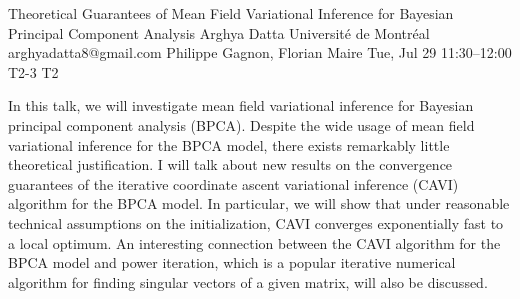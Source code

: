 \documentclass[12pt,lettersize,oneside]{book} %
\begin{document}
\begin{talk}
  {Theoretical Guarantees of Mean Field Variational Inference for Bayesian Principal Component Analysis}%
  {Arghya Datta}%
  {Universit\'e de Montr\'eal}%
  {arghyadatta8@gmail.com}%
  {Philippe Gagnon, Florian Maire}%
  {}%
  {Tue, Jul 29 11:30--12:00}%
  {T2-3}%
  {T2}%
  
    
   
In this talk, we will investigate mean field variational inference for Bayesian principal component analysis (BPCA). Despite the wide usage of mean field variational inference for the BPCA model, there exists remarkably little theoretical justification. I will talk about new results on the convergence guarantees of the iterative coordinate ascent variational inference (CAVI) algorithm for the BPCA model. In particular, we will show that under reasonable technical assumptions on the initialization, CAVI converges exponentially fast to a local optimum. An interesting connection between the CAVI algorithm for the BPCA model and power iteration, which is a popular iterative numerical algorithm for finding singular vectors of a given matrix, will also be discussed.


\end{talk}
\end{document}
